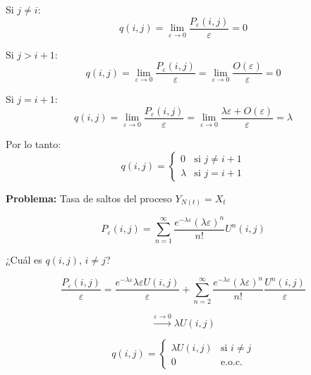 \documentclass[12pt,a4paper]{article}
\begin{document}
Si $j \neq i$:
\begin{equation*}
q(i,j) = \lim_{\varepsilon \to 0} \frac{P_\varepsilon(i,j)}{\varepsilon} = 0
\end{equation*}

Si $j > i+1$:
\begin{equation*}
q(i,j) = \lim_{\varepsilon \to 0} \frac{P_\varepsilon(i,j)}{\varepsilon} = \lim_{\varepsilon \to 0} \frac{O(\varepsilon)}{\varepsilon} = 0
\end{equation*}

Si $j = i+1$:
\begin{equation*}
q(i,j) = \lim_{\varepsilon \to 0} \frac{P_\varepsilon(i,j)}{\varepsilon} = \lim_{\varepsilon \to 0} \frac{\lambda\varepsilon + O(\varepsilon)}{\varepsilon} = \lambda
\end{equation*}

Por lo tanto:
\begin{equation*}
q(i,j) = \begin{cases}
0 & \text{si } j \neq i+1 \\
\lambda & \text{si } j = i+1
\end{cases}
\end{equation*}

\textbf{Problema:} Tasa de saltos del proceso $Y_{N(t)} = X_t$

\begin{equation*}
P_\varepsilon(i,j) = \sum_{n=1}^{\infty} \frac{e^{-\lambda\varepsilon}(\lambda\varepsilon)^n}{n!} U^n(i,j)
\end{equation*}

¿Cuál es $q(i,j)$, $i \neq j$?

\begin{equation*}
\frac{P_\varepsilon(i,j)}{\varepsilon} = \frac{e^{-\lambda\varepsilon} \lambda\varepsilon U(i,j)}{\varepsilon} + \sum_{n=2}^{\infty} \frac{e^{-\lambda\varepsilon}(\lambda\varepsilon)^n}{n!} \frac{U^n(i,j)}{\varepsilon}
\end{equation*}

\begin{equation*}
\xrightarrow{\varepsilon \to 0} \lambda U(i,j)
\end{equation*}

\begin{equation*}
q(i,j) = \begin{cases}
\lambda U(i,j) & \text{si } i \neq j \\
0 & \text{e.o.c.}
\end{cases}
\end{equation*}
\end{document}
